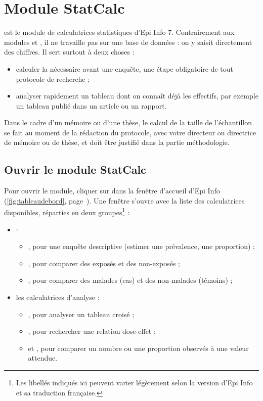 \chapter{Module StatCalc}
\label{moduleStatcalc}

 est le module de calculatrices statistiques d'Epi Info 7. Contrairement aux modules  et , il ne travaille pas sur une base de données : on y saisit directement des chiffres. Il sert surtout à deux choses :
\begin{itemize}
	\item calculer la  nécessaire avant une enquête, une étape obligatoire de tout protocole de recherche ;
	\item analyser rapidement un tableau dont on connaît déjà les effectifs, par exemple un tableau publié dans un article ou un rapport.
\end{itemize}

Dans le cadre d'un mémoire ou d'une thèse, le calcul de la taille de l'échantillon se fait au moment de la rédaction du protocole, avec votre directeur ou directrice de mémoire ou de thèse, et doit être justifié dans la partie méthodologie.

\section{Ouvrir le module StatCalc}

Pour ouvrir le module, cliquer sur  dans la fenêtre d'accueil d'Epi Info (\autoref{fig:tableaudebord}, page~\pageref{fig:tableaudebord}). Une fenêtre s'ouvre avec la liste des calculatrices disponibles, réparties en deux groupes\footnote{Les libellés indiqués ici peuvent varier légèrement selon la version d'Epi Info et sa traduction française.} :

\begin{itemize}
	\item {} :
	\begin{itemize}
		\item {}, pour une enquête descriptive (estimer une prévalence, une proportion) ;
		\item {}, pour comparer des exposés et des non-exposés ;
		\item {}, pour comparer des malades (cas) et des non-malades (témoins) ;
	\end{itemize}
	\item les calculatrices d'analyse :
	\begin{itemize}
		\item {}, pour analyser un tableau croisé ;
		\item {}, pour rechercher une relation dose-effet ;
		\item {} et , pour comparer un nombre ou une proportion observés à une valeur attendue.
	\end{itemize}
\end{itemize}

